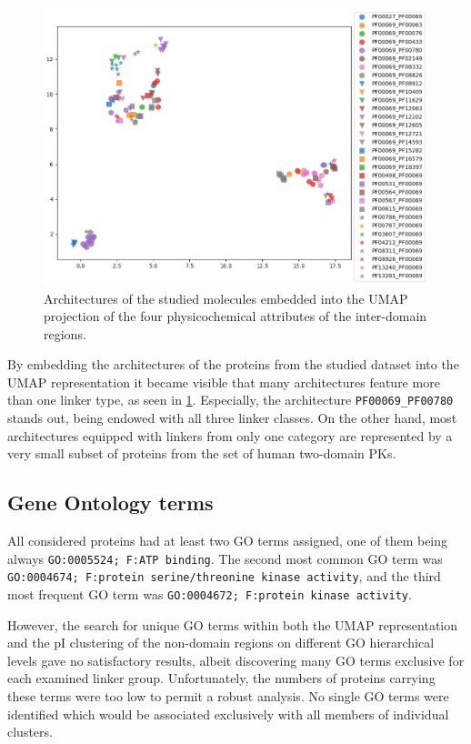 		\begin{figure}
			\centering
			\includegraphics[width=\linewidth]{img/linker_umap_arch.png}
			\caption{Architectures of the studied molecules embedded into the UMAP projection
			of the four physicochemical attributes of the inter-domain regions.}
			\label{fig:umap_arch}
		\end{figure}

		By embedding the architectures of the proteins from the studied dataset into the UMAP
		representation it became visible that many architectures feature more than one linker
		type, as seen in \cref{fig:umap_arch}.
		Especially, the architecture \texttt{PF00069\_PF00780} stands out, being endowed with
		all three linker classes.
		On the other hand, most architectures equipped with linkers from only one category
		are represented by a very small subset of proteins from the set of human two-domain
		PKs.

	\subsection{Gene Ontology terms}
	\label{res:first:go}

		All considered proteins had at least two GO terms assigned, one of them being always
		\texttt{GO:0005524; F:ATP binding}.
		The second most common GO term was \texttt{GO:0004674; F:protein serine/threonine
		kinase activity}, and the third most frequent GO term was \texttt{GO:0004672;
		F:protein kinase activity}.

		However, the search for unique GO terms within both the UMAP representation and the pI
		clustering of the non-domain regions on different GO hierarchical levels gave no
		satisfactory results, albeit discovering many GO terms exclusive for each examined
		linker group.
		Unfortunately, the numbers of proteins carrying these terms were too low to permit a
		robust analysis.
		No single GO terms were identified which would be associated exclusively with all members of individual clusters.


